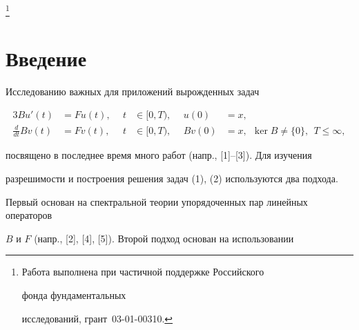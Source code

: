 \thanks{Работа выполнена при частичной поддержке Российского


фонда фундаментальных 


исследований, грант \No\,03-01-00310.} 


 


 


\date{} 




\pagestyle{plain} %


 




\maketitle 


\label{begin} 


 


 


 


\section*{Введение} 


 


Исследованию важных для приложений вырожденных задач 


\begin{alignat}{3} 


Bu'(t)&=Fu(t), &\ \ t&\in[0,T), &\ \ u(0)&=x,\\ 


% 


\frac{d}{dt}Bv(t)&=Fv(t), &\ \ t&\in[0,T), &\ \ Bv(0)&=x, 


\ \ \ker B\ne\{0\},\ \ T\le\infty,


\end{alignat} 


посвящено в последнее время много работ (напр., [1]--[3]). Для изучения 


разрешимости и построения решения задач (1), (2) используются два подхода. 


Первый основан на спектральной теории упорядоченных пар линейных операторов 


$B$ и $F$ (напр., [2], [4], [5]). Второй подход основан на использовании 


